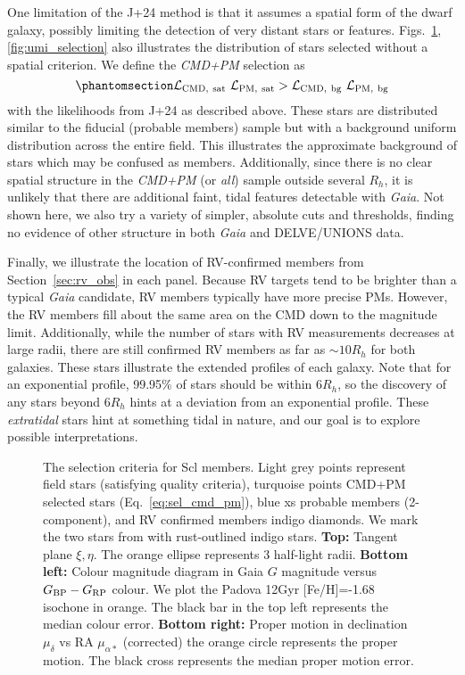 One limitation of the J+24 method is that it assumes a spatial form of
the dwarf galaxy, possibly limiting the detection of very distant stars
or features. Figs.~\ref{fig:scl_selection}, \ref{fig:umi_selection} also
illustrates the distribution of stars selected without a spatial
criterion. We define the \emph{CMD+PM} selection as
\begin{equation}\protect\phantomsection\label{eq:sel_cmd_pm}{
{\cal L}_{\rm CMD,\ sat}\ {\cal L}_{\rm PM,\ sat} > {\cal L}_{\rm CMD,\ bg}\ {\cal L}_{\rm PM,\ bg}
}\end{equation} with the likelihoods from J+24 as described above. These
stars are distributed similar to the fiducial (probable members) sample
but with a background uniform distribution across the entire field. This
illustrates the approximate background of stars which may be confused as
members. Additionally, since there is no clear spatial structure in the
\emph{CMD+PM} (or \emph{all}) sample outside several \(R_h\), it is
unlikely that there are additional faint, tidal features detectable with
\emph{Gaia}. Not shown here, we also try a variety of simpler, absolute
cuts and thresholds, finding no evidence of other structure in both
\emph{Gaia} and DELVE/UNIONS data.

Finally, we illustrate the location of RV-confirmed members from
Section~\ref{sec:rv_obs} in each panel. Because RV targets tend to be
brighter than a typical \emph{Gaia} candidate, RV members typically have
more precise PMs. However, the RV members fill about the same area on
the CMD down to the magnitude limit. Additionally, while the number of
stars with RV measurements decreases at large radii, there are still
confirmed RV members as far as \(\sim 10R_h\) for both galaxies. These
stars illustrate the extended profiles of each galaxy. Note that for an
exponential profile, 99.95\% of stars should be within \(6R_h\), so the
discovery of any stars beyond \(6R_h\) hints at a deviation from an
exponential profile. These \emph{extratidal} stars hint at something
tidal in nature, and our goal is to explore possible interpretations.

\begin{figure}
\centering
{}
\caption[Sculptor sample selection]{The selection criteria for Scl
members. Light grey points represent field stars (satisfying quality
criteria), turquoise points CMD+PM selected stars
(Eq.~\ref{eq:sel_cmd_pm}), blue xs probable members (2-component), and
RV confirmed members indigo diamonds. We mark the two stars from
\citet{sestito+2023a} with rust-outlined indigo stars. \textbf{Top:}
Tangent plane \(\xi, \eta\). The orange ellipse represents 3 half-light
radii. \textbf{Bottom left:} Colour magnitude diagram in Gaia \(G\)
magnitude versus \(G_{\rm BP} - G_{\rm RP}\) colour. We plot the Padova
12Gyr {[}Fe/H{]}=-1.68 isochone in orange. The black bar in the top left
represents the median colour error. \textbf{Bottom right:} Proper motion
in declination \(\mu_\delta\) vs RA \(\mu_{\alpha*}\) (corrected) the
orange circle represents the \citet{MV2020b} proper motion. The black
cross represents the median proper motion
error.}\label{fig:scl_selection}
\end{figure}

